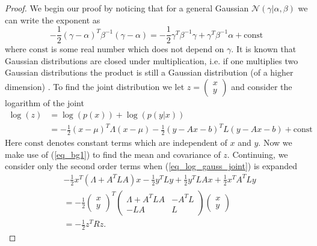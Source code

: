 \begin{proof}
We begin our proof by noticing that for a general Gaussian $\mathcal{N}(\gamma|\alpha, \beta)$ we can write the exponent as 
\begin{equation}
-\frac{1}{2}\left(\gamma-\alpha \right)^T\beta^{-1}\left(\gamma-\alpha \right) = -\frac{1}{2}\gamma^T\beta^{-1}\gamma +\gamma^T\beta^{-1}\alpha + \text{const}
\label{eq_bg1} 
\end{equation} 
where $\text{const}$ is some real number which does not depend on $\gamma$. It is known that Gaussian distributions are closed under multiplication, i.e. if one multiplies two Gaussian distributions the product is still a Gaussian distribution (of a higher dimension) \cite{bishop}. To find the joint distribution we let $z = \begin{pmatrix}
x \\ y
\end{pmatrix}$ and consider the logarithm of the joint
\begin{equation}
\begin{aligned}
\log(z) &= \log(p(x)) + \log(p(y|x))\\
&=  -\frac{1}{2}(x-\mu)^T\Lambda(x-\mu) -\frac{1}{2}(y-Ax-b)^T L(y-Ax-b) + \text{const}
\end{aligned}
\label{eq_log_gauss_joint}
\end{equation}
Here $\text{const}$ denotes constant terms which are independent of $x$ and $y$. Now we make use of (\ref{eq_bg1}) to find the mean and covariance of $z$. Continuing, we consider only the second order terms when (\ref{eq_log_gauss_joint}) is expanded
\begin{equation}
\begin{aligned}
&-\frac{1}{2}x^T(\Lambda+A^TLA)x-\frac{1}{2}y^TLy + \frac{1}{2}y^TLAx+\frac{1}{2}x^TA^TLy \\
&= -\frac{1}{2}\begin{pmatrix}
x \\ y
\end{pmatrix}^T \begin{pmatrix}
\Lambda+A^TLA & -A^TL \\ -LA & L
\end{pmatrix}\begin{pmatrix}
x \\ y
\end{pmatrix} \\
&= -\frac{1}{2}z^TRz.
\end{aligned}
\label{eq_gauss_joint_precision}
\end{equation}

\end{proof}
